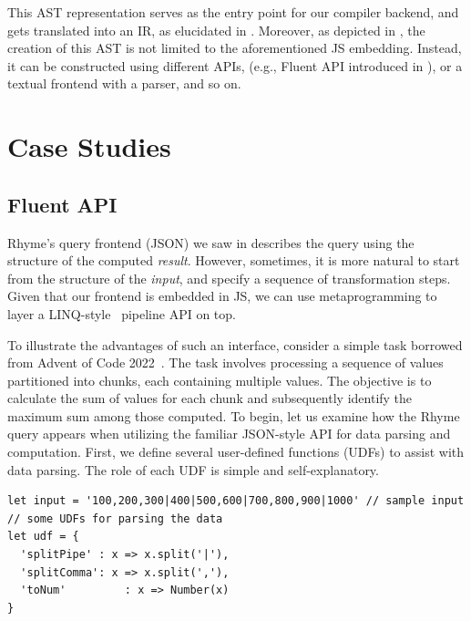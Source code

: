 \documentclass[runningheads]{llncs}
\newcommand{\lang}{Rhyme}
\begin{document}
This AST representation serves as the entry point for our compiler backend, and gets
translated into an IR, as elucidated in .
Moreover, as depicted in , the creation of this AST is not
limited to the aforementioned JS embedding.
Instead, it can be constructed using different APIs, (e.g., Fluent API introduced in ),
or a textual frontend with a parser, and so on.

\vspace{-4mm}
\section{Case Studies}\label{sec:case_studies}
\vspace{-3mm}
\subsection{Fluent API}\label{subsec:fluent}
\vspace{-2mm}
\lang{}'s query frontend (JSON) we saw in  describes the query
using the structure of the computed \emph{result}.
However, sometimes, it is more natural to start from the structure of the 
\emph{input}, and specify a sequence of transformation steps.
Given that our frontend is embedded in JS, we can use metaprogramming to
layer a LINQ-style~\cite{linq_sigmod} pipeline API on top.

To illustrate the advantages of such an interface, consider a
simple task borrowed from Advent of Code 2022~\cite{adventofcode22}.
The task involves processing a sequence of values partitioned into chunks,
each containing multiple values.
The objective is to calculate the sum of values for each chunk and
subsequently identify the maximum sum among those computed.
To begin, let us examine how the \lang{} query appears when utilizing
the familiar JSON-style API for data parsing and computation.
First, we define several user-defined functions (UDFs) to assist with data parsing.
The role of each UDF is simple and self-explanatory.

\begin{lstlisting}[style=JavaScript, columns=flexible]
let input = '100,200,300|400|500,600|700,800,900|1000' // sample input
// some UDFs for parsing the data
let udf = {
  'splitPipe' : x => x.split('|'),
  'splitComma': x => x.split(','),
  'toNum'         : x => Number(x)
}
\end{lstlisting}
\end{document}
